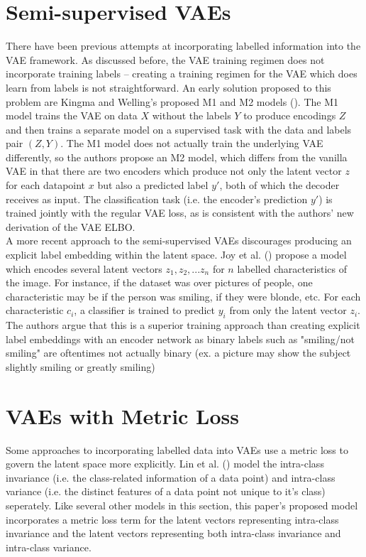 \documentclass[./dissertation.tex]{subfiles}
\begin{document}
\section{Semi-supervised VAEs}
There have been previous attempts at incorporating labelled information into the VAE framework. As discussed before, the VAE training regimen does not incorporate training labels -- creating a training regimen for the VAE which does learn from labels is not straightforward. An early solution proposed to this problem are Kingma and Welling's proposed M1 and M2 models (\citeyear{kingma2014autoencoding}). The M1 model trains the VAE on data $X$ without the labels $Y$ to produce encodings $Z$ and then trains a separate model on a supervised task with the data and labels pair $(Z, Y)$. The M1 model does not actually train the underlying VAE differently, so the authors propose an M2 model, which differs from the vanilla VAE in that there are two encoders which produce not only the latent vector $z$ for each datapoint $x$ but also a predicted label $y'$, both of which the decoder receives as input. The classification task (i.e. the encoder's prediction $y'$) is trained jointly with the regular VAE loss, as is consistent with the authors' new derivation of the VAE ELBO. \\

A more recent approach to the semi-supervised VAEs discourages producing an explicit label embedding within the latent space. Joy et al. (\citeyear{joy2020capturing}) propose a model which encodes several latent vectors $z_{1}, z_{2}, ... z_{n}$ for $n$ labelled characteristics of the image. For instance, if the dataset was over pictures of people, one characteristic may be if the person was smiling, if they were blonde, etc. For each characteristic $c_{i}$, a classifier is trained to predict $y_{i}$ from only the latent vector $z_{i}$. The authors argue that this is a superior training approach than creating explicit label embeddings with an encoder network as binary labels such as "smiling/not smiling" are oftentimes not actually binary (ex. a picture may show the subject slightly smiling or greatly smiling)

\section{VAEs with Metric Loss}

Some approaches to incorporating labelled data into VAEs use a metric loss to govern the latent space more explicitly. Lin et al. (\citeyear{lin2018deep}) model the intra-class invariance (i.e. the class-related information of a data point) and intra-class variance (i.e. the distinct features of a data point not unique to it's class) seperately. Like several other models in this section, this paper's proposed model incorporates a metric loss term for the latent vectors representing intra-class invariance and the latent vectors representing both intra-class invariance and intra-class variance. \\
\end{document}
